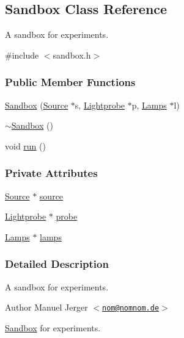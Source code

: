 \hypertarget{classSandbox}{\subsection{\-Sandbox \-Class \-Reference}
\label{classSandbox}
}


\-A sandbox for experiments.  




{\ttfamily \#include $<$sandbox.\-h$>$}

\subsubsection*{\-Public \-Member \-Functions}
\begin{DoxyCompactItemize}
\item 
\hyperlink{classSandbox_a13ccb73772605bcc82b744d5d96d4f4d}{\-Sandbox} (\hyperlink{classSource}{\-Source} $\ast$s, \hyperlink{classLightprobe}{\-Lightprobe} $\ast$p, \hyperlink{classLamps}{\-Lamps} $\ast$l)
\item 
\hyperlink{classSandbox_a311cd2959f627fd2058edb0d2d395ca3}{$\sim$\-Sandbox} ()
\item 
void \hyperlink{classSandbox_a681a908b15155a24d6c586e32bf6f21a}{run} ()
\end{DoxyCompactItemize}
\subsubsection*{\-Private \-Attributes}
\begin{DoxyCompactItemize}
\item 
\hyperlink{classSource}{\-Source} $\ast$ \hyperlink{classSandbox_a10660a3b26800199b24925733855c48d}{source}
\item 
\hyperlink{classLightprobe}{\-Lightprobe} $\ast$ \hyperlink{classSandbox_a68feafc08400bdd9733d7a962232595a}{probe}
\item 
\hyperlink{classLamps}{\-Lamps} $\ast$ \hyperlink{classSandbox_a5aa92c278978a338f564ff7242697ba2}{lamps}
\end{DoxyCompactItemize}


\subsubsection{\-Detailed \-Description}
\-A sandbox for experiments. 

\begin{DoxyAuthor}{\-Author}
\-Manuel \-Jerger $<$\href{mailto:nom@nomnom.de}{\tt nom@nomnom.\-de}$>$
\end{DoxyAuthor}
\hyperlink{classSandbox}{\-Sandbox} for experiments. 

